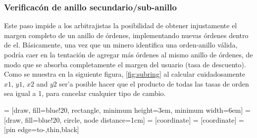 \documentclass[UTF8,nofonts]{article}
\makeatletter
\newenvironment{figurehere}
 {\def\@captype{figure}}
 {}
\makeatother
\begin{document}
\begin{multicols}{2}
\subsubsection{Verificac\'on de anillo secundario/sub-anillo\label{sec:sub_ring_check}}
Este paso impide a los arbitrajistas la posibilidad de obtener injustamente el margen completo de un anillo de \'ordenes, implementando nuevas \'ordenes dentro de el. B\'asicamente, una vez que un minero identifica una orden-anillo v\'alida, podr\'ia caer en la tentaci\'on de agregar m\'as \'ordenes al mismo anillo de \'ordenes, de modo que se absorba completamente el margen del usuario (tasa de descuento). Como se muestra en la siguiente figura, \ref{fig:subring} al calcular cuidadosamente $x1$, $y1$, $x2$ and $y2$ ser'a posible hacer que el producto de todas las tasas de orden sea igual a 1, para cancelar cualquier tipo de cambio.

\begin{center}
\begin{figurehere}
\centering
{} = [draw, fill=blue!20, rectangle, 
    minimum height=3em, minimum width=6em]
 = [draw, fill=blue!20, circle, node distance=1cm]
 = [coordinate]
 = [coordinate]
 = [pin edge={to-,thin,black}]

\end{figurehere}
\end{center}
\end{multicols}
\end{document}
